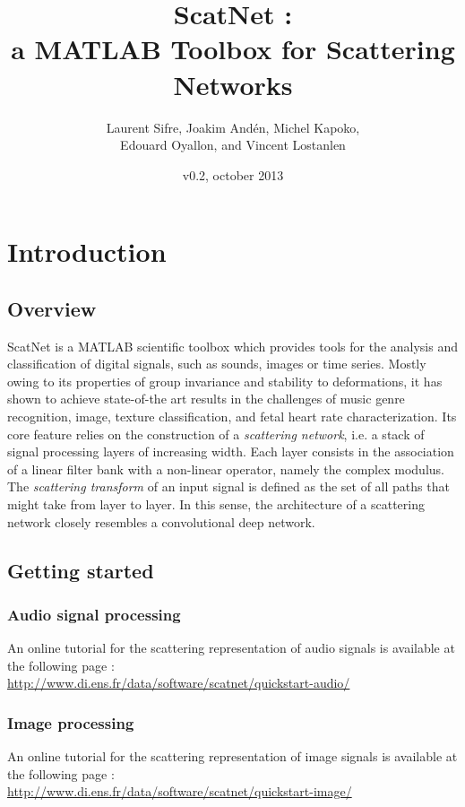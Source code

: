 \documentclass{article}
\title{ScatNet : \\ a MATLAB Toolbox for Scattering Networks}
\author{Laurent Sifre, Joakim And\'{e}n, Michel Kapoko, \\ Edouard Oyallon, and Vincent Lostanlen}
\date{v0.2, october 2013}
\begin{document}
    
\maketitle

\section{Introduction}

\subsection{Overview}
ScatNet is a MATLAB scientific toolbox which provides tools for the analysis and classification of digital signals, such as sounds, images or time series. Mostly owing to its properties of group invariance and stability to deformations, it has shown to achieve state-of-the art results in the challenges of music genre recognition, image, texture classification, and fetal heart rate characterization.
Its core feature relies on the construction of a \emph{scattering network}, i.e. a stack of signal processing layers of increasing width. Each layer consists in the association of a linear filter bank  with a non-linear operator, namely the complex modulus.
The \emph{scattering transform} of an input signal  is defined as the set of all paths that  might take from layer to layer. In this sense, the architecture of a scattering network closely resembles a convolutional deep network.

\subsection{Getting started}
\subsubsection{Audio signal processing}
An online tutorial for the scattering representation of audio signals is available at the following page : \\
\hfill \url{http://www.di.ens.fr/data/software/scatnet/quickstart-audio/} \hfill

\subsubsection{Image processing}
An online tutorial for the scattering representation of image signals is available at the following page : \\
\hfill \url{http://www.di.ens.fr/data/software/scatnet/quickstart-image/} \hfill
\end{document}
